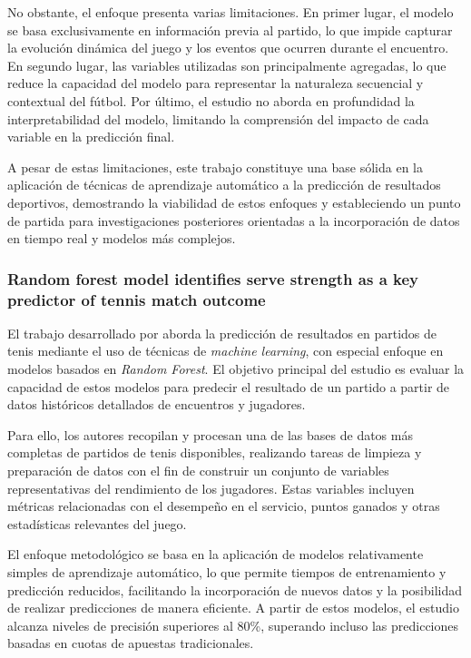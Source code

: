 No obstante, el enfoque presenta varias limitaciones. En primer lugar, el modelo se basa exclusivamente en información previa al partido, lo que impide capturar la evolución dinámica del juego y los eventos que ocurren durante el encuentro. En segundo lugar, las variables utilizadas son principalmente agregadas, lo que reduce la capacidad del modelo para representar la naturaleza secuencial y contextual del fútbol. Por último, el estudio no aborda en profundidad la interpretabilidad del modelo, limitando la comprensión del impacto de cada variable en la predicción final.

A pesar de estas limitaciones, este trabajo constituye una base sólida en la aplicación de técnicas de aprendizaje automático a la predicción de resultados deportivos, demostrando la viabilidad de estos enfoques y estableciendo un punto de partida para investigaciones posteriores orientadas a la incorporación de datos en tiempo real y modelos más complejos.

\subsubsection{Random forest model identifies serve strength as a key predictor of tennis match outcome}

El trabajo desarrollado por \cite{gao2019random} aborda la predicción de resultados en partidos de tenis mediante el uso de técnicas de \textit{machine learning}, con especial enfoque en modelos basados en \textit{Random Forest}. El objetivo principal del estudio es evaluar la capacidad de estos modelos para predecir el resultado de un partido a partir de datos históricos detallados de encuentros y jugadores.

Para ello, los autores recopilan y procesan una de las bases de datos más completas de partidos de tenis disponibles, realizando tareas de limpieza y preparación de datos con el fin de construir un conjunto de variables representativas del rendimiento de los jugadores. Estas variables incluyen métricas relacionadas con el desempeño en el servicio, puntos ganados y otras estadísticas relevantes del juego.

El enfoque metodológico se basa en la aplicación de modelos relativamente simples de aprendizaje automático, lo que permite tiempos de entrenamiento y predicción reducidos, facilitando la incorporación de nuevos datos y la posibilidad de realizar predicciones de manera eficiente. A partir de estos modelos, el estudio alcanza niveles de precisión superiores al 80\%, superando incluso las predicciones basadas en cuotas de apuestas tradicionales.

